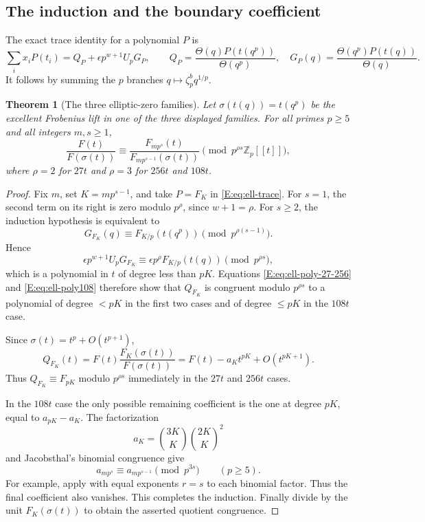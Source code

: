 \documentclass[11pt,a4paper]{article}
\newtheorem{theorem}{Theorem}[section]
\theoremstyle{definition}\newtheorem{definition}[theorem]{Definition}
\theoremstyle{remark}\newtheorem{remark}[theorem]{Remark}
\numberwithin{equation}{section}
\begin{document}
\subsection{The induction and the boundary coefficient}

The exact trace identity for a polynomial $P$ is
\begin{equation}\label{E:eq:ell-trace}
 \sum_i x_iP(t_i)=Q_P+\epsilon p^{w+1}U_pG_P,
 \qquad
 Q_P=\frac{\Theta(q)P(t(q^p))}{\Theta(q^p)},\quad
 G_P(q)=\frac{\Theta(q^p)P(t(q))}{\Theta(q)}.
\end{equation}
It follows by summing the $p$ branches $q\mapsto\zeta_p^bq^{1/p}$.

\begin{theorem}[The three elliptic-zero families]\label{E:thm:ell-all-s}
Let $\sigma(t(q))=t(q^p)$ be the excellent Frobenius lift in one of
the three displayed families.  For all primes $p\geq5$ and all
integers $m,s\geq1$,
\[
 \frac{F(t)}{F(\sigma(t))}
 \equiv\frac{F_{mp^s}(t)}{F_{mp^{s-1}}(\sigma(t))}
 \pmod{p^{\rho s}\mathbb Z_p[[t]]},
\]
where $\rho=2$ for $27t$ and $\rho=3$ for $256t$ and $108t$.
\end{theorem}

\begin{proof}
Fix $m$, set $K=mp^{s-1}$, and take $P=F_K$ in
\eqref{E:eq:ell-trace}.  For $s=1$, the second term on its right is
zero modulo $p^\rho$, since $w+1=\rho$.
For $s\geq2$, the induction hypothesis is equivalent to
\[
 G_{F_K}(q)\equiv F_{K/p}(t(q^p))\pmod{p^{\rho(s-1)}}.
\]
Hence
\[
 \epsilon p^{w+1}U_pG_{F_K}
 \equiv\epsilon p^\rho F_{K/p}(t(q))\pmod{p^{\rho s}},
\]
which is a polynomial in $t$ of degree less than $pK$.
Equations \eqref{E:eq:ell-poly-27-256} and \eqref{E:eq:ell-poly108}
therefore show that $Q_{F_K}$ is congruent modulo $p^{\rho s}$
to a polynomial of degree $<pK$ in the first two cases and
of degree $\leq pK$ in the $108t$ case.

Since $\sigma(t)=t^p+O(t^{p+1})$,
\[
 Q_{F_K}(t)
 =F(t)\frac{F_K(\sigma(t))}{F(\sigma(t))}
 =F(t)-a_Kt^{pK}+O(t^{pK+1}).
\]
Thus $Q_{F_K}\equiv F_{pK}$ modulo $p^{\rho s}$ immediately
in the $27t$ and $256t$ cases.

In the $108t$ case the only possible remaining coefficient is
the one at degree $pK$, equal to $a_{pK}-a_K$.
The factorization
\[
 a_K=\binom{3K}{K}\binom{2K}{K}^2
\]
and Jacobsthal's binomial congruence give
\[
 a_{mp^s}\equiv a_{mp^{s-1}}\pmod{p^{3s}}
 \qquad(p\geq5).
\]
For example, apply \cite[Lemma 2.1]{St23} with equal exponents $r=s$ to
each binomial factor.  Thus the final coefficient also vanishes.
This completes the induction.  Finally divide by the unit
$F_K(\sigma(t))$ to obtain the asserted quotient congruence.
\end{proof}
\end{document}
